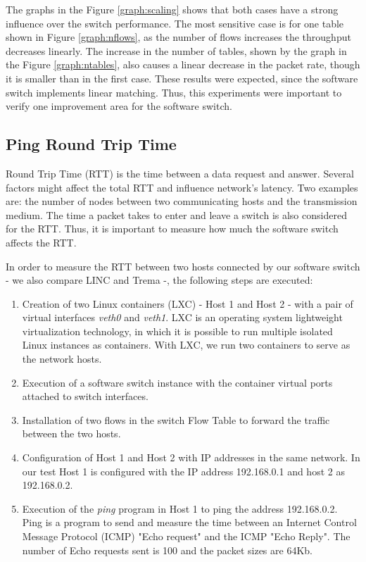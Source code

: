         The graphs in the Figure \ref{graph:scaling} shows that both cases have a strong influence over the switch performance. The most sensitive case is for one table shown in Figure \ref{graph:nflows}, as the number of flows increases the throughput decreases linearly. The increase in the number of tables, shown by the graph in the Figure \ref{graph:ntables}, also causes a linear decrease in the packet rate, though it is smaller than in the first case. These results were expected, since the software switch implements linear matching. Thus, this experiments were important to verify one improvement area for the software switch.     
     
    \subsection{Ping Round Trip Time}

    Round Trip Time (RTT) is the time between a data request and answer. Several factors might affect the total RTT and  influence network's latency. Two examples are: the number of nodes between two communicating hosts and the transmission medium. The time a packet takes to enter and leave a switch is also considered for the RTT. Thus, it is important to measure how much the software switch affects the RTT. 
    
    In order to measure the RTT between two hosts connected by our software switch - we also compare LINC and Trema -, the following steps are executed:
    
    \begin{enumerate}
    \item Creation of two Linux containers (LXC) - Host 1 and Host 2 - with a pair of virtual interfaces \textit{veth0} and \textit{veth1}. LXC is an operating system lightweight virtualization technology, in which it is possible to run multiple isolated Linux instances as containers. With LXC, we run two containers to serve as the network hosts.    
    \item Execution of a software switch instance with the container virtual ports attached to switch interfaces.
    \item Installation of two flows in the switch Flow Table to forward the traffic between the two hosts. 
    \item Configuration of Host 1 and Host 2 with IP addresses in the same network. In our test Host 1 is configured with the IP address 192.168.0.1 and host 2 as 192.168.0.2. 
    \item Execution of the \textit{ping} program in Host 1 to ping the address 192.168.0.2. Ping is a program to send and measure the time between an Internet Control Message Protocol (ICMP) "Echo request" and the ICMP "Echo Reply". The number of Echo requests sent is 100 and the packet sizes are 64Kb.
    \end{enumerate}

